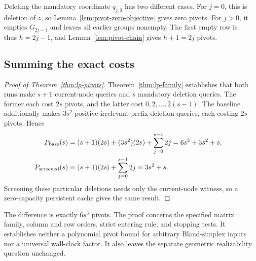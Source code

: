 Deleting the mandatory coordinate $q_{j,0}$ has two different cases.
For $j=0$, this is deletion of $z$, so
Lemma~\ref{lem:pivot-zero-objective} gives zero pivots. For $j>0$, it
empties $G_{2j-1}$ and leaves all earlier groups nonempty. The first empty
row is thus $h=2j-1$, and Lemma~\ref{lem:pivot-chain} gives
$h+1=2j$ pivots.

\subsection{Summing the exact costs}

\begin{proof}[Proof of Theorem~\ref{thm:lp-pivots}]
Theorem~\ref{thm:lp-family} establishes that both runs make $s+1$
current-node queries and $s$ mandatory deletion queries. The former
each cost $2s$ pivots, and the latter cost $0,2,\ldots,2(s-1)$.
The baseline additionally makes $3s^2$ positive irrelevant-prefix
deletion queries, each costing $2s$ pivots. Hence
\begin{align*}
 P_{\rm base}(s)
   &=(s+1)(2s)+(3s^2)(2s)+\sum_{j=0}^{s-1}2j
     =6s^3+3s^2+s,\\
 P_{\rm screened}(s)
   &=(s+1)(2s)+\sum_{j=0}^{s-1}2j
     =3s^2+s.
\end{align*}
Screening these particular deletions needs only the current-node witness,
so a zero-capacity persistent cache gives the same result.
\end{proof}

The difference is exactly $6s^3$ pivots. The proof concerns the specified
matrix family, column and row orders, strict entering rule, and stopping
tests. It establishes neither a polynomial pivot bound for arbitrary
Bland-simplex inputs nor a universal wall-clock factor. It also leaves
the separate geometric realizability question unchanged.
